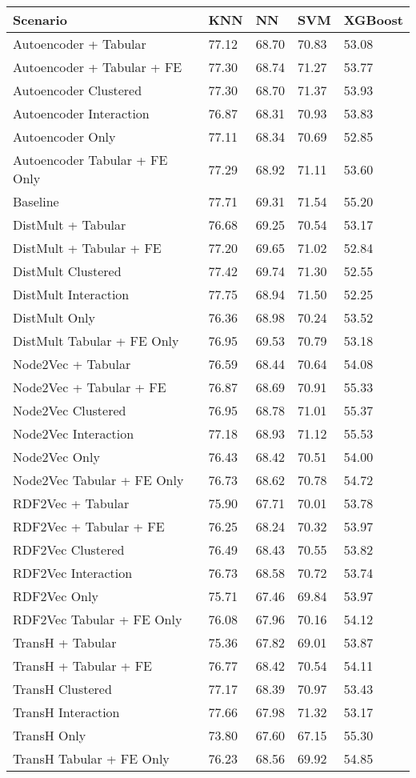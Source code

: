 \begin{tabular}{lllll}
\toprule
Scenario & KNN & NN & SVM & XGBoost \\
\midrule
Autoencoder + Tabular & 77.12 & 68.70 & 70.83 & 53.08 \\
Autoencoder + Tabular + FE & 77.30 & 68.74 & 71.27 & 53.77 \\
Autoencoder Clustered & 77.30 & 68.70 & 71.37 & 53.93 \\
Autoencoder Interaction & 76.87 & 68.31 & 70.93 & 53.83 \\
Autoencoder Only & 77.11 & 68.34 & 70.69 & 52.85 \\
Autoencoder Tabular + FE Only & 77.29 & 68.92 & 71.11 & 53.60 \\
Baseline & 77.71 & 69.31 & 71.54 & 55.20 \\
DistMult + Tabular & 76.68 & 69.25 & 70.54 & 53.17 \\
DistMult + Tabular + FE & 77.20 & 69.65 & 71.02 & 52.84 \\
DistMult Clustered & 77.42 & 69.74 & 71.30 & 52.55 \\
DistMult Interaction & 77.75 & 68.94 & 71.50 & 52.25 \\
DistMult Only & 76.36 & 68.98 & 70.24 & 53.52 \\
DistMult Tabular + FE Only & 76.95 & 69.53 & 70.79 & 53.18 \\
Node2Vec + Tabular & 76.59 & 68.44 & 70.64 & 54.08 \\
Node2Vec + Tabular + FE & 76.87 & 68.69 & 70.91 & 55.33 \\
Node2Vec Clustered & 76.95 & 68.78 & 71.01 & 55.37 \\
Node2Vec Interaction & 77.18 & 68.93 & 71.12 & 55.53 \\
Node2Vec Only & 76.43 & 68.42 & 70.51 & 54.00 \\
Node2Vec Tabular + FE Only & 76.73 & 68.62 & 70.78 & 54.72 \\
RDF2Vec + Tabular & 75.90 & 67.71 & 70.01 & 53.78 \\
RDF2Vec + Tabular + FE & 76.25 & 68.24 & 70.32 & 53.97 \\
RDF2Vec Clustered & 76.49 & 68.43 & 70.55 & 53.82 \\
RDF2Vec Interaction & 76.73 & 68.58 & 70.72 & 53.74 \\
RDF2Vec Only & 75.71 & 67.46 & 69.84 & 53.97 \\
RDF2Vec Tabular + FE Only & 76.08 & 67.96 & 70.16 & 54.12 \\
TransH + Tabular & 75.36 & 67.82 & 69.01 & 53.87 \\
TransH + Tabular + FE & 76.77 & 68.42 & 70.54 & 54.11 \\
TransH Clustered & 77.17 & 68.39 & 70.97 & 53.43 \\
TransH Interaction & 77.66 & 67.98 & 71.32 & 53.17 \\
TransH Only & 73.80 & 67.60 & 67.15 & 55.30 \\
TransH Tabular + FE Only & 76.23 & 68.56 & 69.92 & 54.85 \\
\bottomrule
\end{tabular}
